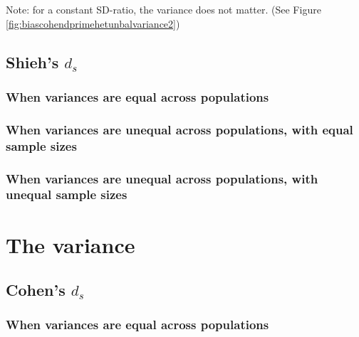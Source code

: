 \documentclass[
  man]{apa6}
\begin{document}
Note: for a constant SD-ratio, the variance does not matter. (See Figure \ref{fig:biascohendprimehetunbalvariance2})

\hypertarget{shiehs-d_s}{%
\subsection{\texorpdfstring{Shieh's \(d_s\)}{Shieh's d\_s}}\label{shiehs-d_s}}

\hypertarget{when-variances-are-equal-across-populations-2}{%
\subsubsection{When variances are equal across populations}\label{when-variances-are-equal-across-populations-2}}

\hypertarget{when-variances-are-unequal-across-populations-with-equal-sample-sizes-1}{%
\subsubsection{When variances are unequal across populations, with equal sample sizes}\label{when-variances-are-unequal-across-populations-with-equal-sample-sizes-1}}

\hypertarget{when-variances-are-unequal-across-populations-with-unequal-sample-sizes-1}{%
\subsubsection{When variances are unequal across populations, with unequal sample sizes}\label{when-variances-are-unequal-across-populations-with-unequal-sample-sizes-1}}

\hypertarget{the-variance}{%
\section{The variance}\label{the-variance}}

\hypertarget{cohens-d_s-2}{%
\subsection{\texorpdfstring{Cohen's \(d_s\)}{Cohen's d\_s}}\label{cohens-d_s-2}}

\hypertarget{when-variances-are-equal-across-populations-3}{%
\subsubsection{When variances are equal across populations}\label{when-variances-are-equal-across-populations-3}}
\end{document}
